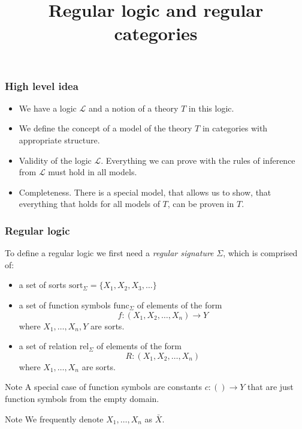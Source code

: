 \documentclass[14pt]{beamer}
\title{Regular logic and regular categories}
\author{}
\date{}
\theoremstyle{plain}
\begin{document}
  \begin{frame}
    \titlepage

  \end{frame}

  \begin{frame}
    \frametitle{High level idea}
    \pause
    \begin{itemize}
      \item We have a logic $\mathcal{L}$ and a notion of a theory $T$ in this logic.
      \pause
      \item We define the concept of a model of the theory $T$ in categories with appropriate structure.
      \pause
      \item Validity of the logic $\mathcal{L}$. Everything we can prove with the rules
        of inference from $\mathcal{L}$ must hold in all models.
      \pause
      \item Completeness. There is a special model, that allows us to show, that everything
        that holds for all models of $T$, can be proven in $T$.
    \end{itemize}
  \end{frame}

  \begin{frame}
    \frametitle{Regular logic}
    To define a regular logic we first need a \emph{regular signature}
    $\Sigma$, which is comprised of:
    \begin{itemize}
      \pause
      \item a set of sorts $\mathrm{sort}_{\Sigma} = \{ X_{1}, X_{2}, X_{3}, \ldots{} \}$
      \pause
      \item a set of function symbols $\mathrm{func}_{\Sigma}$ of elements of the form
      \[ f : ( X_{1}, X_{2}, \ldots, X_{n} ) \to Y \]
      where $X_{1}, \ldots{}, X_{n}, Y$ are sorts.
      \pause
      \item a set of relation $\mathrm{rel}_{\Sigma}$ of elements of the form
        \[ R : (X_{1}, X_{2}, \ldots, X_{n} ) \]
      where $X_{1}, \ldots{}, X_{n}$ are sorts.
      \end{itemize}
  \end{frame}

  \begin{frame}
    \begin{block}{Note}
      A special case of function symbols are constants $c : () \to Y$ that are just
      function symbols from the empty domain.
    \end{block}
    \pause 
    \begin{block}{Note}
      We frequently denote $X_1, \ldots, X_n$ as $\bar{X}$.
    \end{block}
  \end{frame}
\end{document}
